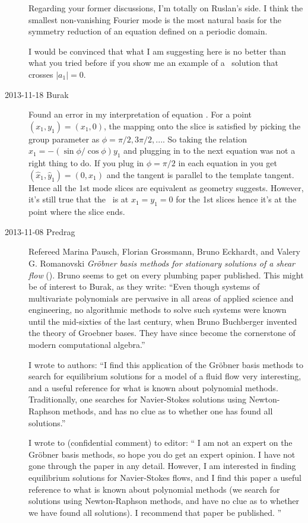 \begin{description}
Regarding your former discussions, I'm totally on Ruslan's side. I think the
smallest non-vanishing Fourier mode is the most natural basis for the symmetry
reduction of an equation defined on a periodic domain.

I would be convinced that what I am suggesting here is no better than what
you tried before if you show me an example of a \KS\ solution that crosses
$|a_1| = 0$.

\item[2013-11-18 Burak]
Found an error in my interpretation of equation .
For a point $(x_1, y_1) = (x_1, 0)$, the mapping onto the slice is satisfied
by picking the group parameter as $\phi = \pi / 2, 3 \pi / 2,...$. So taking
the relation $x_1 = - (\sin{\phi}/\cos{\phi})y_1$ and plugging in to the next equation
was not a right thing to do. If you plug in $\phi = \pi/2$ in each equation in
 you get $(\hat{x}_1, \hat{y}_1) = (0, x_1)$ and
the tangent is parallel to the template tangent. Hence all the 1st mode slices
are equivalent as geometry suggests. However, it's still true that the \chartBord\
is at $x_1 = y_1 = 0$ for the 1st slices hence it's at the point where the slice
ends.

\item[2013-11-08  Predrag]
Refereed Marina Pausch, Florian Grossmann, Bruno Eckhardt, and Valery
G. Romanovski\rf{PGER13} {\em Gr{\"o}bner basis methods for stationary
solutions of a shear flow}
(). Bruno
seems to get on every plumbing paper published. This might be of
interest to Burak, as they write: ``Even though systems of
multivariate polynomials are pervasive in all areas of applied
science and engineering, no algorithmic methods to solve such systems
were known until the mid-sixties of the last century, when Bruno
Buchberger invented the theory of Groebner bases. They have since
become the cornerstone of modern computational algebra.''


I wrote to authors:
``I find this application of the Gr{\"o}bner basis methods to search for
equilibrium solutions for a model of a fluid flow very interesting,
and a useful reference for what is known about polynomial methods.
Traditionally, one searches for Navier-Stokes solutions using
Newton-Raphson methods, and has no clue as to whether one has found
all solutions.''

I wrote to (confidential comment) to editor:
`` I am not an expert on the Gr{\"o}bner basis methods, so hope you do
get an expert opinion. I have not gone through the paper in any
detail. However, I am interested in finding equilibrium solutions for
Navier-Stokes flows, and I find this paper a useful reference to what
is known about polynomial methods (we search for solutions using
Newton-Raphson methods, and have no clue as to whether we have found
all solutions). I recommend that paper be published. ''


\end{description}
